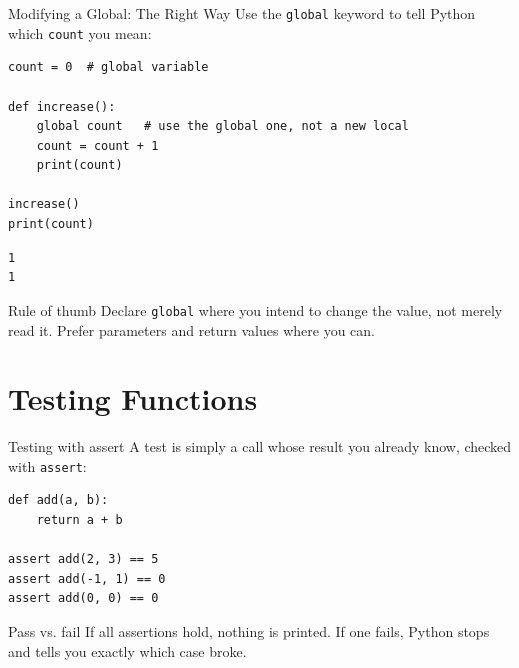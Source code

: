 \documentclass[9pt,aspectratio=169,xcolor=table]{beamer}
\begin{document}
\begin{frame}[fragile]{Modifying a Global: The Right Way}
    \leavevmode
    Use the \texttt{global} keyword to tell Python which \texttt{count}
    you mean:

\begin{lstlisting}
count = 0  # global variable

def increase():
    global count   # use the global one, not a new local
    count = count + 1
    print(count)

increase()
print(count)
\end{lstlisting}
\begin{lstlisting}[style=skoutput]
1
1
\end{lstlisting}

    \vspace{1mm}
    \begin{alertblock}{Rule of thumb}
        Declare \texttt{global} where you intend to \alert{change} the
        value, not merely read it. Prefer parameters and return values
        where you can.
    \end{alertblock}
\end{frame}

\section{Testing Functions}

\begin{frame}[fragile]{Testing with assert}
    \leavevmode
    A test is simply a call whose result you already know, checked with
    \texttt{assert}:

\begin{lstlisting}
def add(a, b):
    return a + b

assert add(2, 3) == 5
assert add(-1, 1) == 0
assert add(0, 0) == 0
\end{lstlisting}

    \vspace{2mm}
    \begin{block}{Pass vs. fail}
        If all assertions hold, nothing is printed. If one fails,
        Python stops and tells you \alert{exactly which case} broke.
    \end{block}
\end{frame}
\end{document}
